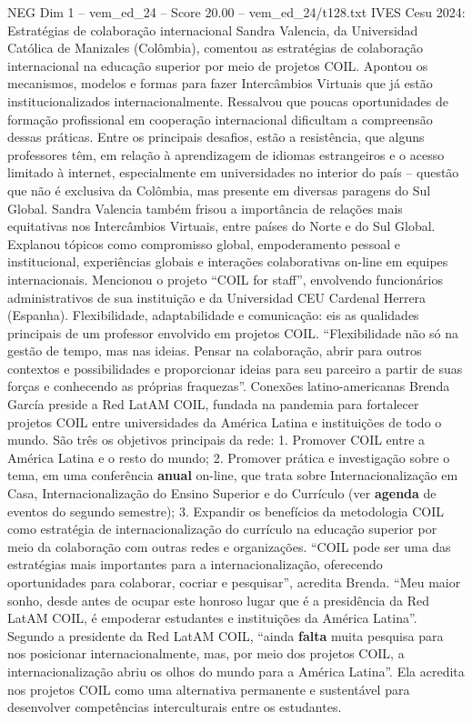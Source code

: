 \begin{textsample}{NEG Dim 1 – vem\_ed\_24 – Score 20.00 – vem\_ed\_24/t128.txt}  \label{ex:f1_neg_136}
IVES Cesu 2024: Estratégias de colaboração internacional Sandra Valencia, da Universidad Católica de Manizales (Colômbia), comentou as estratégias de colaboração internacional na educação superior por meio de projetos COIL.
Apontou os mecanismos, modelos e formas para fazer Intercâmbios Virtuais que já estão institucionalizados internacionalmente.
Ressalvou que poucas oportunidades de formação profissional em cooperação internacional dificultam a compreensão dessas práticas.
Entre os principais desafios, estão a resistência, que alguns professores têm, em relação à aprendizagem de idiomas estrangeiros e o acesso limitado à internet, especialmente em universidades no interior do país – questão que não é exclusiva da Colômbia, mas presente em diversas paragens do Sul Global.
Sandra Valencia também frisou a importância de relações mais equitativas nos Intercâmbios Virtuais, entre países do Norte e do Sul Global.
Explanou tópicos como compromisso global, empoderamento pessoal e institucional, experiências globais e interações colaborativas on-line em equipes internacionais.
Mencionou o projeto “COIL for staff”, envolvendo funcionários administrativos de sua instituição e da Universidad CEU Cardenal Herrera (Espanha).
Flexibilidade, adaptabilidade e comunicação: eis as qualidades principais de um professor envolvido em projetos COIL. “Flexibilidade não só na gestão de tempo, mas nas ideias.
Pensar na colaboração, abrir para outros contextos e possibilidades e proporcionar ideias para seu parceiro a partir de suas forças e conhecendo as próprias fraquezas”.
Conexões latino-americanas Brenda García preside a Red LatAM COIL, fundada na pandemia para fortalecer projetos COIL entre universidades da América Latina e instituições de todo o mundo.
São três os objetivos principais da rede: 1.
Promover COIL entre a América Latina e o resto do mundo; 2.
Promover prática e investigação sobre o tema, em uma conferência \textbf{anual} on-line, que trata sobre Internacionalização em Casa, Internacionalização do Ensino Superior e do Currículo (ver \textbf{agenda} de eventos do segundo semestre); 3.
Expandir os benefícios da metodologia COIL como estratégia de internacionalização do currículo na educação superior por meio da colaboração com outras redes e organizações. “COIL pode ser uma das estratégias mais importantes para a internacionalização, oferecendo oportunidades para colaborar, cocriar e pesquisar”, acredita Brenda. “Meu maior sonho, desde antes de ocupar este honroso lugar que é a presidência da Red LatAM COIL, é empoderar estudantes e instituições da América Latina”.
Segundo a presidente da Red LatAM COIL, “ainda \textbf{falta} muita pesquisa para nos posicionar internacionalmente, mas, por meio dos projetos COIL, a internacionalização abriu os olhos do mundo para a América Latina”.
Ela acredita nos projetos COIL como uma alternativa permanente e sustentável para desenvolver competências interculturais entre os estudantes.

\end{textsample}
